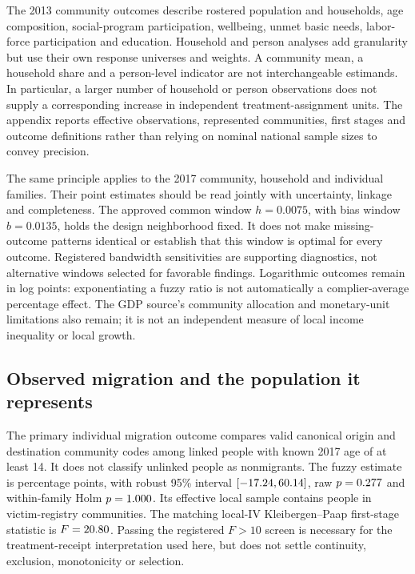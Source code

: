 The 2013 community outcomes describe rostered population and households,
age composition, social-program participation, wellbeing, unmet basic needs,
labor-force participation and education. Household and person analyses add
granularity but use their own response universes and weights. A community
mean, a household share and a person-level indicator are not interchangeable
estimands. In particular, a larger number of household or person observations
does not supply a corresponding increase in independent treatment-assignment
units. The appendix reports effective observations, represented communities,
first stages and outcome definitions rather than relying on nominal national
sample sizes to convey precision.

The same principle applies to the 2017 community, household and individual
families. Their point estimates should be read jointly with uncertainty,
linkage and completeness. The approved common window
\(h=0.0075\), with bias window \(b=0.0135\), holds the design neighborhood
fixed. It does not make missing-outcome patterns identical or establish that
this window is optimal for every outcome. Registered bandwidth sensitivities
are supporting diagnostics, not alternative windows selected for favorable
findings. Logarithmic outcomes remain in log points: exponentiating a fuzzy
ratio is not automatically a complier-average percentage effect. The GDP
source's community allocation and monetary-unit limitations also remain;
it is not an independent measure of local income inequality or local growth.

\subsection{Observed migration and the population it represents}

The primary individual migration outcome compares valid canonical origin and
destination community codes among linked people with known 2017 age of at
least 14. It does not classify unlinked people as nonmigrants. The fuzzy
estimate is \MigrationEffect{} percentage points, with robust 95\% interval
\([-17.24{},60.14{}]\), raw
\(p=0.277{}\) and within-family Holm
\(p=1.000{}\). Its effective local sample contains
\MigrationN{} people in \MigrationCCPP{} victim-registry communities.
The matching local-IV Kleibergen--Paap first-stage statistic is
\(F=20.80{}\). Passing the registered \(F>10\) screen is necessary
for the treatment-receipt interpretation used here, but does not settle
continuity, exclusion, monotonicity or selection.


